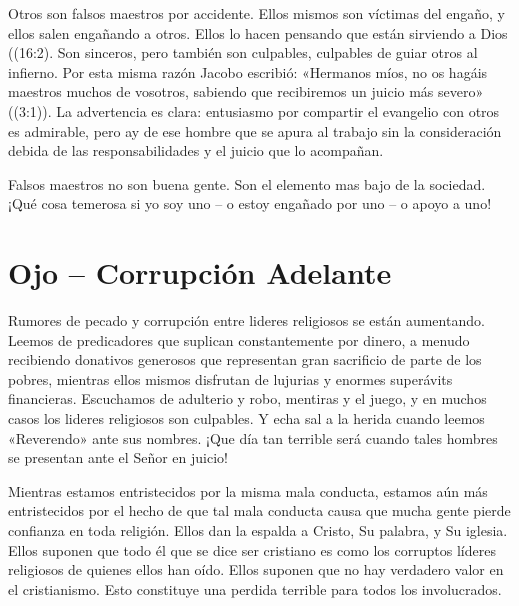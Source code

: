 \documentclass[12pt, twoside, openright]{book}
\begin{document}
Otros son falsos maestros por accidente. Ellos mismos son víctimas del engaño, y ellos salen engañando a otros. Ellos lo hacen pensando que están sirviendo a Dios ((16:2). Son sinceros, pero también son culpables, culpables de guiar otros al infierno. Por esta misma razón Jacobo escribió: «Hermanos míos, no os hagáis maestros muchos de vosotros, sabiendo que recibiremos un juicio más severo» ((3:1)). La advertencia es clara: entusiasmo por compartir el evangelio con otros es admirable, pero ay de ese hombre que se apura al trabajo sin la consideración debida de las responsabilidades y el juicio que lo acompañan.

Falsos maestros no son buena gente. Son el elemento mas bajo de la sociedad. ¡Qué cosa temerosa si yo soy uno – o estoy engañado por uno – o apoyo a uno!

\section{Ojo – Corrupción Adelante}
Rumores de pecado y corrupción entre lideres religiosos se están aumentando. Leemos de predicadores que suplican constantemente por dinero, a menudo recibiendo donativos generosos que representan gran sacrificio de parte de los pobres, mientras ellos mismos disfrutan de lujurias y enormes superávits financieras. Escuchamos de adulterio y robo, mentiras y el juego, y en muchos casos los lideres religiosos son culpables. Y echa sal a la herida cuando leemos «Reverendo» ante sus nombres. ¡Que día tan terrible será cuando tales hombres se presentan ante el Señor en juicio!

Mientras estamos entristecidos por la misma mala conducta, estamos aún más entristecidos por el hecho de que tal mala conducta causa que mucha gente pierde confianza en toda religión. Ellos dan la espalda a Cristo, Su palabra, y Su iglesia. Ellos suponen que todo él que se dice ser cristiano es como los corruptos líderes religiosos de quienes ellos han oído. Ellos suponen que no hay verdadero valor en el cristianismo. Esto constituye una perdida terrible para todos los involucrados.
\end{document}
